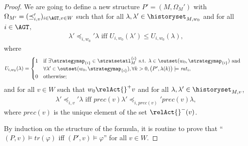 \begin{proof}
 We are going to define a new structure
  $P'=(M,\Omega_{M}' )   $
with
  $\Omega_{M' }=(\preceq_{i,v } '  )_{i \in \AGT, v \in W }$
  such that  for all $\lambda, \lambda' \in  \historyset_{M,w_0 } $
  and for all $i \in \AGT$, 
  \begin{align*}
\lambda'  \preceq_{i,w_0  }'  \lambda
\text{ iff }
\mathit{U}_{i,w_0 }(\lambda' ) \leq \mathit{U}_{i,w_0 }(\lambda),
  \end{align*}
  where 
    \begin{align*}
& \mathit{U}_{i,w_0 }(\lambda)= 
\begin{cases}
1 & \text{if }   \exists \strategymap_{\{i\}} \in  \stratsetatl^{\{i\}}_M
 \text{ s.t. } \lambda \in \outset(w_0, \strategymap_{\{i\}}  ) \text{ and }\\
&  \forall \lambda' \in  \outset(w_0, \strategymap_{\{i\}}  ),
 \forall k> 0, \big(P', \lambda(k)\big) \models  \mathit{rat}_i , \\
0 &  \text{otherwise};
\end{cases}
      \end{align*}
      and for all $v \in W$
      such that $w_0 \relAct{ }^+  v$
      and for all $\lambda, \lambda' \in  \historyset_{M, v } $, 
  \begin{align*}
\lambda'  \preceq_{i,v   }'   \lambda
\text{ iff }
\mathit{prec}(v)\lambda'  \preceq_{i,\mathit{prec}(v)   }'  \mathit{prec}(v) \lambda, 
  \end{align*}
  where 
  $\mathit{prec}(v)$
  is 
  the unique element of 
  the set 
  $\relAct{ }^-(v)$. 

      
By induction on the structure of the formula,
it is routine to prove that 
``$(P,v )\models \mathit{tr}( \varphi )$ iff
  $(P',v )\models \varphi $'' for all $v \in W$.

\end{proof}

 


